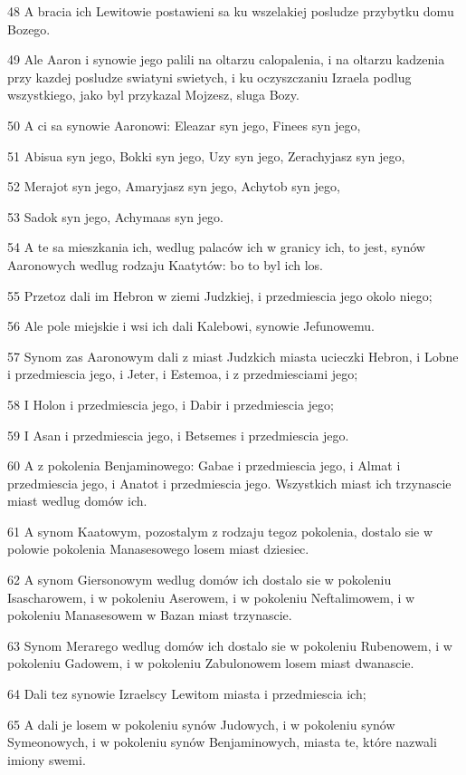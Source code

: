 \par 48 A bracia ich Lewitowie postawieni sa ku wszelakiej posludze przybytku domu Bozego.
\par 49 Ale Aaron i synowie jego palili na oltarzu calopalenia, i na oltarzu kadzenia przy kazdej posludze swiatyni swietych, i ku oczyszczaniu Izraela podlug wszystkiego, jako byl przykazal Mojzesz, sluga Bozy.
\par 50 A ci sa synowie Aaronowi: Eleazar syn jego, Finees syn jego,
\par 51 Abisua syn jego, Bokki syn jego, Uzy syn jego, Zerachyjasz syn jego,
\par 52 Merajot syn jego, Amaryjasz syn jego, Achytob syn jego,
\par 53 Sadok syn jego, Achymaas syn jego.
\par 54 A te sa mieszkania ich, wedlug palaców ich w granicy ich, to jest, synów Aaronowych wedlug rodzaju Kaatytów: bo to byl ich los.
\par 55 Przetoz dali im Hebron w ziemi Judzkiej, i przedmiescia jego okolo niego;
\par 56 Ale pole miejskie i wsi ich dali Kalebowi, synowie Jefunowemu.
\par 57 Synom zas Aaronowym dali z miast Judzkich miasta ucieczki Hebron, i Lobne i przedmiescia jego, i Jeter, i Estemoa, i z przedmiesciami jego;
\par 58 I Holon i przedmiescia jego, i Dabir i przedmiescia jego;
\par 59 I Asan i przedmiescia jego, i Betsemes i przedmiescia jego.
\par 60 A z pokolenia Benjaminowego: Gabae i przedmiescia jego, i Almat i przedmiescia jego, i Anatot i przedmiescia jego. Wszystkich miast ich trzynascie miast wedlug domów ich.
\par 61 A synom Kaatowym, pozostalym z rodzaju tegoz pokolenia, dostalo sie w polowie pokolenia Manasesowego losem miast dziesiec.
\par 62 A synom Giersonowym wedlug domów ich dostalo sie w pokoleniu Isascharowem, i w pokoleniu Aserowem, i w pokoleniu Neftalimowem, i w pokoleniu Manasesowem w Bazan miast trzynascie.
\par 63 Synom Merarego wedlug domów ich dostalo sie w pokoleniu Rubenowem, i w pokoleniu Gadowem, i w pokoleniu Zabulonowem losem miast dwanascie.
\par 64 Dali tez synowie Izraelscy Lewitom miasta i przedmiescia ich;
\par 65 A dali je losem w pokoleniu synów Judowych, i w pokoleniu synów Symeonowych, i w pokoleniu synów Benjaminowych, miasta te, które nazwali imiony swemi.
